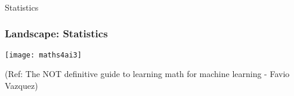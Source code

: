 \begin{frame}[fragile]\frametitle{}
\begin{center}
{\Large Statistics}
\end{center}
\end{frame}

 \begin{frame}[fragile] \frametitle{Landscape: Statistics}

\begin{center}
\texttt{[image: maths4ai3]}
\end{center}

{\tiny (Ref: The NOT definitive guide to learning math for machine learning - Favio Vazquez)}

\end{frame}


